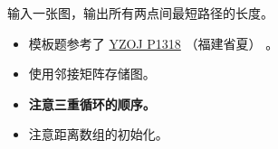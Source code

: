 \noindent 输入一张图，输出所有两点间最短路径的长度。

\begin{itemize}
    \item 模板题参考了 \href{https://oiproxy.bugminer.top/OnlineJudge/problem_show.php?id=1318}{YZOJ P1318} （福建省夏） 。
    \item 使用邻接矩阵存储图。
    \item \textbf{注意三重循环的顺序。}
    \item 注意距离数组的初始化。
\end{itemize}